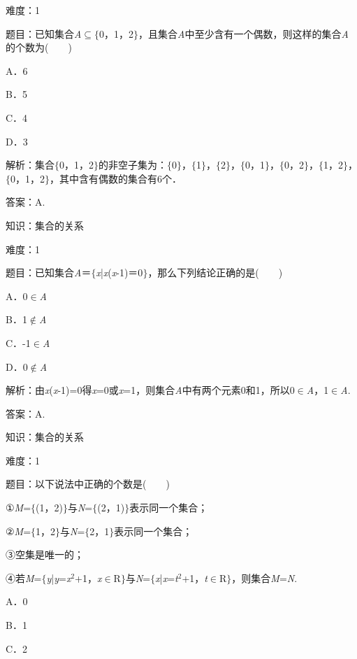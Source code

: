 \documentclass{article} %
\begin{document}
难度：1

题目：已知集合\textit{A}$\mathrm{\subseteq}$$\mathrm{\{}$0，1，2$\mathrm{\}}$，且集合\textit{A}中至少含有一个偶数，则这样的集合\textit{A}的个数为(　　)

A．6　　　　

B．5　　　

C．4　　

D．3

解析：集合$\mathrm{\{}$0，1，2$\mathrm{\}}$的非空子集为：$\mathrm{\{}$0$\mathrm{\}}$，$\mathrm{\{}$1$\mathrm{\}}$，$\mathrm{\{}$2$\mathrm{\}}$，$\mathrm{\{}$0，1$\mathrm{\}}$，$\mathrm{\{}$0，2$\mathrm{\}}$，$\mathrm{\{}$1，2$\mathrm{\}}$，$\mathrm{\{}$0，1，2$\mathrm{\}}$，其中含有偶数的集合有6个．

答案：A.

知识：集合的关系

难度：1

题目：已知集合\textit{A}＝$\mathrm{\{}$\textit{x}|\textit{x}(\textit{x}-1)＝0$\mathrm{\}}$，那么下列结论正确的是(　　)

A．0$\mathrm{\in}$\textit{A}   

B．1$\mathrm{\notin}$\textit{A}

C．-1$\mathrm{\in}$\textit{A}  

D．0$\mathrm{\notin}$\textit{A}

解析：由\textit{x}(\textit{x}-1)=0得\textit{x}=0或\textit{x}=1，则集合\textit{A}中有两个元素0和1，所以0$\mathrm{\in}$\textit{A}，1$\mathrm{\in}$\textit{A}.

答案：A.

知识：集合的关系

难度：1

题目：以下说法中正确的个数是(　　)

①\textit{M}=$\mathrm{\{}$(1，2)$\mathrm{\}}$与\textit{N}=$\mathrm{\{}$(2，1)$\mathrm{\}}$表示同一个集合；

②\textit{M}=$\mathrm{\{}$1，2$\mathrm{\}}$与\textit{N}=$\mathrm{\{}$2，1$\mathrm{\}}$表示同一个集合；

③空集是唯一的；

④若\textit{M}=$\mathrm{\{}$\textit{y}|\textit{y}=\textit{x}${}^{2}$+1，\textit{x}$\mathrm{\in}$R$\mathrm{\}}$与\textit{N}=$\mathrm{\{}$\textit{x}|\textit{x}=\textit{t}${}^{2}$+1，\textit{t}$\mathrm{\in}$R$\mathrm{\}}$，则集合\textit{M}=\textit{N}.

A．0  

B．1 

C．2  
\end{document}
